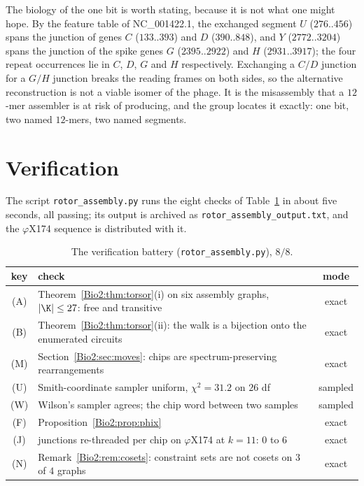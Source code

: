 The biology of the one bit is worth stating, because it is not what one might hope. By
the feature table of NC\_001422.1, the exchanged segment $U$ ($276..456$) spans the
junction of genes $C$ ($133..393$) and $D$ ($390..848$), and $Y$ ($2772..3204$) spans the
junction of the spike genes $G$ ($2395..2922$) and $H$ ($2931..3917$); the four repeat
occurrences lie in $C$, $D$, $G$ and $H$ respectively. Exchanging a $C/D$ junction for a
$G/H$ junction breaks the reading frames on both sides, so the alternative reconstruction
is not a viable isomer of the phage. It is the misassembly that a $12$-mer assembler is at
risk of producing, and the group locates it exactly: one bit, two named $12$-mers, two
named segments.

\section{Verification}\label{Bio2:sec:battery}

The script \texttt{rotor\_assembly.py} runs the eight checks of Table~\ref{Bio2:tab:battery} in
about five seconds, all passing; its output is archived as
\texttt{rotor\_assembly\_output.txt}, and the $\varphi$X174 sequence is distributed with it.

\begin{table}[ht]
\centering\small
\begin{tabular}{clc}
\toprule
key & check & mode\\
\midrule
(A) & Theorem~\ref{Bio2:thm:torsor}(i) on six assembly graphs, $|\K|\le27$: free and transitive & exact\\
(B) & Theorem~\ref{Bio2:thm:torsor}(ii): the walk is a bijection onto the enumerated circuits & exact\\
(M) & Section~\ref{Bio2:sec:moves}: chips are spectrum-preserving rearrangements & exact\\
(U) & Smith-coordinate sampler uniform, $\chi^{2}=31.2$ on $26$ df & sampled\\
(W) & Wilson's sampler agrees; the chip word between two samples & sampled\\
(F) & Proposition~\ref{Bio2:prop:phix} & exact\\
(J) & junctions re-threaded per chip on $\varphi$X174 at $k=11$: $0$ to $6$ & exact\\
(N) & Remark~\ref{Bio2:rem:cosets}: constraint sets are not cosets on $3$ of $4$ graphs & exact\\
\bottomrule
\end{tabular}
\caption{The verification battery (\texttt{rotor\_assembly.py}), $8/8$.}
\label{Bio2:tab:battery}
\end{table}

